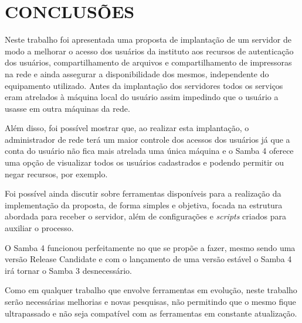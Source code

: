 \chapter{CONCLUSÕES}

Neste trabalho foi apresentada uma proposta de implantação de um servidor de modo a melhorar o acesso dos usuários da instituto aos recursos de autenticação dos usuários, compartilhamento de arquivos e compartilhamento de impressoras na rede e ainda assegurar a disponibilidade dos mesmos, independente do equipamento utilizado. Antes da implantação dos servidores todos os serviços eram atrelados à máquina local do usuário assim impedindo que o usuário a usasse em outra máquinas da rede.

Além disso, foi possível mostrar que, ao realizar esta implantação, o administrador de rede terá um maior controle dos acessos dos usuários já que a conta do usuário não fica mais atrelada uma única máquina e o Samba 4 oferece uma opção de visualizar todos os usuários cadastrados e podendo permitir ou negar recursos, por exemplo.

Foi possível ainda discutir sobre ferramentas disponíveis para a realização da implementação da proposta, de forma simples e objetiva, focada na estrutura abordada para receber o servidor, além de configurações e \textit{scripts} criados para auxiliar o processo.


O Samba 4 funcionou perfeitamente no que se propõe a fazer, mesmo sendo uma versão Release Candidate e com o lançamento de uma versão estável o Samba 4 irá tornar o Samba 3 desnecessário.

Como em qualquer trabalho que envolve ferramentas em evolução, neste trabalho serão necessárias melhorias e novas pesquisas, não permitindo que o mesmo fique ultrapassado e não seja compatível com as ferramentas em constante atualização.




